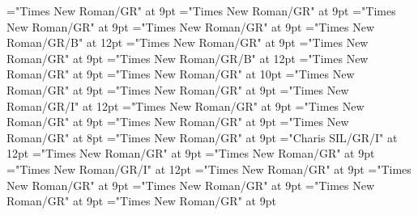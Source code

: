 \documentclass[gps1,twoside]{article}
\begin{document}
\font\spanowningentrysummarydefinitioncomplexformsnotsubentrycomplexformsnotsubentriessensesensesentrylastchildafter="Times New Roman/GR" at 9pt
\font\nontrivialentryrootnontrivialentryrootnontrivialentryrootscomplexformsnotsubentrycomplexformsnotsubentriessensesensesentrybefore="Times New Roman/GR" at 9pt
\font\nontrivialentryrootscomplexformsnotsubentrycomplexformsnotsubentriessensesensesentrybefore="Times New Roman/GR" at 9pt
\font\nontrivialentryrootscomplexformsnotsubentrycomplexformsnotsubentriessensesensesentryafter="Times New Roman/GR" at 9pt
\font\nontrivialentryrootnontrivialentryrootscomplexformsnotsubentrycomplexformsnotsubentriessensesensesentry="Times New Roman/GR/B" at 12pt
\font\spanspansensecontentspansensessensesensesentrybefore="Times New Roman/GR" at 9pt
\font\sensessensesensesentryafter="Times New Roman/GR" at 9pt
\font\sensenumbersensecontentsensessensesensesentry="Times New Roman/GR/B" at 12pt
\font\sensenumbersensecontentsensessensesensesentryafter="Times New Roman/GR" at 9pt
\font\sensesensessensesensesentry="Times New Roman/GR" at 10pt
\font\sensetypesensesensessensesensesentrybefore="Times New Roman/GR" at 9pt
\font\sensetypesensesensessensesensesentryafter="Times New Roman/GR" at 9pt
\font\sensetypesensesensessensesensesentry="Times New Roman/GR/I" at 12pt
\font\spanspanabbreviationsensetypesensesensessensesensesentrybefore="Times New Roman/GR" at 9pt
\font\spanspandefinitionorglosssensesensessensesensesentrybefore="Times New Roman/GR" at 9pt
\font\spandefinitionorglosssensesensessensesensesentrylastchildafter="Times New Roman/GR" at 9pt
\font\exampleexampleexamplessensesensessensesensesentrybefore="Times New Roman/GR" at 8pt
\font\examplessensesensessensesensesentryafter="Times New Roman/GR" at 9pt
\font\spanbzhexampleexampleexamplessensesensessensesensesentry="Charis SIL/GR/I" at 12pt
\font\spanspanexampleexampleexamplessensesensessensesensesentrybefore="Times New Roman/GR" at 9pt
\font\spanexampleexampleexamplessensesensessensesensesentrylastchildafter="Times New Roman/GR" at 9pt
\font\spanexampleexampleexamplessensesensessensesensesentry="Times New Roman/GR/I" at 12pt
\font\spanspantranslationtranslationtranslationsexampleexamplessensesensessensesensesentrybefore="Times New Roman/GR" at 9pt
\font\spantranslationtranslationtranslationsexampleexamplessensesensessensesensesentrylastchildafter="Times New Roman/GR" at 9pt
\font\spanspanencyclopedicinfosensesensessensesensesentrybefore="Times New Roman/GR" at 9pt
\font\spanencyclopedicinfosensesensessensesensesentryfirstchildbefore="Times New Roman/GR" at 9pt
\font\spanencyclopedicinfosensesensessensesensesentrylastchildafter="Times New Roman/GR" at 9pt
\end{document}
